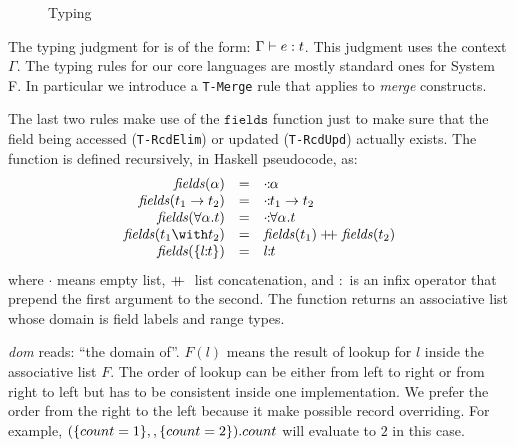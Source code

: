 \begin{figure*}



\caption{Typing}
\end{figure*}

The typing judgment for \name is of the form: $ \Gamma \vdash e : t $. This
judgment uses the context $ \Gamma $. The typing rules for our core languages
are mostly standard ones for System F. In particular we introduce a
\texttt{T-Merge} rule that applies to \emph{merge} constructs.

The last two rules make use of the $ \texttt{fields} $ function just to make
sure that the field being accessed (\texttt{T-RcdElim}) or updated
(\texttt{T-RcdUpd}) actually exists. The function is defined recursively, in
Haskell pseudocode, as:
\[ \begin{array}{rll}
  \fields{\alpha} & = & \rel{\cdot}{\alpha} \\
  \fields{t_1 \to t_2} & = & \rel{\cdot}{t_1 \to t_2} \\
  \fields{\forall \alpha. t} & = & \rel{\cdot}{\forall \alpha. t} \\
  \fields{t_1 \with t_2} & = & \fields{t_1} \dplus \fields{t_2} \\
  \fields{\recordtype{l}{t}} & = & \rel{l}{t}
\end{array} \]
where $ \cdot $ means empty list, $ +\!\!\!+ \; $ list concatenation, and $ : $ is an
infix operator that prepend the first argument to the second. The function
returns an associative list whose domain is field labels and range types.

\textit{dom} reads: ``the domain of''. $ F(l) $ means the result of lookup for
$ l $ inside the associative list $ F $. The order of lookup can be either from
left to right or from right to left but has to be consistent inside one
implementation. We prefer the order from the right to the left because it make
possible record overriding. For example,
$ (\{ count = 1 \} ,, \{ count = 2 \}).count $ will evaluate to
$ 2 $ in this case.